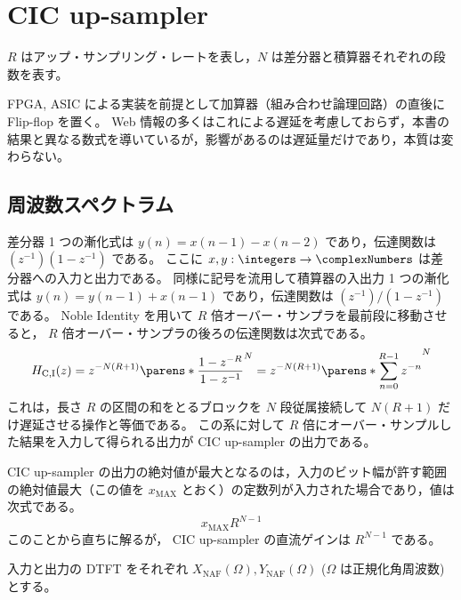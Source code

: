 \section{CIC up-sampler}
    \label{CIC up-sampler}
    \newcommand*{\XNAF}{X_\text{NAF}}
    \newcommand*{\YNAF}{Y_\text{NAF}}
    \newcommand*{\tYNAF}{\tilde{Y}_\text{NAF}}
    \newcommand*{\XNF}{X_\text{NF}}
    \newcommand*{\YNF}{Y_\text{NF}}
    \newcommand*{\tYNF}{\tilde{Y}_\text{NF}}

    $R$ はアップ・サンプリング・レートを表し，$N$ は差分器と積算器それぞれの段数を表す。
    \par
    FPGA, ASIC による実装を前提として加算器（組み合わせ論理回路）の直後に Flip-flop を置く。
    Web 情報の多くはこれによる遅延を考慮しておらず，本書の結果と異なる数式を導いているが，影響があるのは遅延量だけであり，本質は変わらない。
    \subsection{周波数スペクトラム}
        \label{CIC up-sampler の周波数スペクトラム}
        差分器 1 つの漸化式は $y(n) = x(n-1) - x(n-2)$ であり，伝達関数は $(z^{-1})(1-z^{-1})$ である。
        ここに $x,y:\integers\to\complexNumbers$ は差分器への入力と出力である。
        同様に記号を流用して積算器の入出力 1 つの漸化式は $y(n) = y(n-1) + x(n-1)$ であり，伝達関数は $(z^{-1})/(1-z^{-1})$ である。
        Noble Identity を用いて $R$ 倍オーバー・サンプラを最前段に移動させると， $R$ 倍オーバー・サンプラの後ろの伝達関数は次式である。
        \[ H_\text{C,I}(z) = z^{-N(R+1)}\parens*{\frac{1-z^{-R}}{1-z^{-1}}}^N = z^{-N(R+1)}\parens*{\sum_{n=0}^{R-1} z^{-n}}^N \]
        これは，長さ $R$ の区間の和をとるブロックを $N$ 段従属接続して $N(R+1)$ だけ遅延させる操作と等価である。
        この系に対して $R$ 倍にオーバー・サンプルした結果を入力して得られる出力が CIC up-sampler の出力である。
        \par
        CIC up-sampler の出力の絶対値が最大となるのは，入力のビット幅が許す範囲の絶対値最大（この値を $x_\text{MAX}$ とおく）の定数列が入力された場合であり，値は次式である。
        \begin{equation}
            x_\text{MAX}R^{N-1}
            \label{equation:CIC up-sampler の出力の絶対値の最大値}
        \end{equation}
        このことから直ちに解るが， CIC up-sampler の直流ゲインは $R^{N-1}$ である。
        \par
        入力と出力の DTFT をそれぞれ $\XNAF(\Omega), \YNAF(\Omega)$ ($\Omega$ は正規化角周波数) とする。
